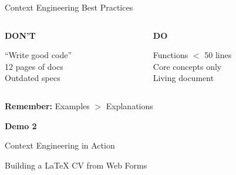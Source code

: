 \documentclass[aspectratio=169]{beamer}
\begin{document}
\begin{frame}{Context Engineering Best Practices}
  \begin{columns}[T]
    \begin{column}{0.48\textwidth}
      \centering
      \large\bfseries
      \textcolor{conesaOrange}{DON'T}

      \vspace{0.5cm}
      \normalsize
      ``Write good code''\\
      \vspace{0.3cm}
      12 pages of docs\\
      \vspace{0.3cm}
      Outdated specs
    \end{column}
    \begin{column}{0.48\textwidth}
      \centering
      \large\bfseries
      \textcolor{conesaTeal}{DO}

      \vspace{0.5cm}
      \normalsize
      Functions $<$ 50 lines\\
      \vspace{0.3cm}
      Core concepts only\\
      \vspace{0.3cm}
      Living document
    \end{column}
  \end{columns}

  \vspace{0.5cm}
  \centering
  \normalsize
  \textbf{Remember:} Examples $>$ Explanations
\end{frame}

\begin{frame}[plain]
  \centering
  \vspace{2cm}
  {\Huge\bfseries\textcolor{conesaTeal}{Demo 2}}
  
  \vspace{0.8cm}
  {\Large Context Engineering in Action}
  
  \vspace{0.5cm}
  {\large Building a LaTeX CV from Web Forms}
\end{frame}
\end{document}

